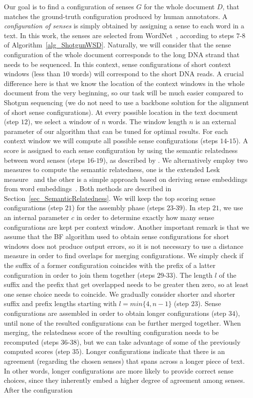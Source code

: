 \documentclass[11pt]{article}
\begin{document}
Our goal is to find a configuration of senses $G$ for the whole document $D$, that matches the ground-truth configuration produced by human annotators. A \emph{configuration of senses} is simply obtained by assigning a sense to each word in a text. In this work, the senses are selected from WordNet~\cite{Miller-WN-1995,Fellbaum-WN-1998}, according to steps $7$-$8$ of Algorithm~\ref{alg_ShotgunWSD}. Naturally, we will consider that the sense configuration of the whole document corresponds to the long DNA strand that needs to be sequenced. In this context, sense configurations of short context windows (less than $10$ words) will correspond to the short DNA reads. A crucial difference here is that we know the location of the context windows in the whole document from the very beginning, so our task will be much easier compared to Shotgun sequencing (we do not need to use a backbone solution for the alignment of short sense configurations). At every possible location in the text document (step $12$), we select a window of $n$ words. The window length $n$ is an external parameter of our algorithm that can be tuned for optimal results. For each context window we will compute all possible sense configurations (steps $14$-$15$). A score is assigned to each sense configuration by using the semantic relatedness between word senses (steps $16$-$19$), as described by . We alternatively employ two measures to compute the semantic relatedness, one is the extended Lesk measure~\cite{Banerjee-CICLING-2002,Banerjee-IJCAI-2003} and the other is a simple approach based on deriving sense embeddings from word embeddings~\cite{Mikolov-NIPS-2013}. Both methods are described in Section~\ref{sec_SemanticRelatedness}. We will keep the top scoring sense configurations (step $21$) for the assembly phase (steps $23$-$39$). In step $21$, we use an internal parameter $c$ in order to determine exactly how many sense configurations are kept per context window. Another important remark is that we assume that the BF algorithm used to obtain sense configurations for short windows does not produce output errors, so it is not necessary to use a distance measure in order to find overlaps for merging configurations. We simply check if the suffix of a former configuration coincides with the prefix of a latter configuration in order to join them together (steps $29$-$33$). The length $l$ of the suffix and the prefix that get overlapped needs to be greater then zero, so at least one sense choice needs to coincide. We gradually consider shorter and shorter suffix and prefix lengths starting with $l = min\{4,n-1\}$ (step $23$). Sense configurations are assembled in order to obtain longer configurations (step $34$), until none of the resulted configurations can be further merged together. When merging, the relatedness score of the resulting configuration needs to be recomputed (steps $36$-$38$), but we can take advantage of some of the previously computed scores (step $35$). Longer configurations indicate that there is an agreement (regarding the chosen senses) that spans across a longer piece of text. In other words, longer configurations are more likely to provide correct sense choices, since they inherently embed a higher degree of agreement among senses. After the configuration 
\end{document}
